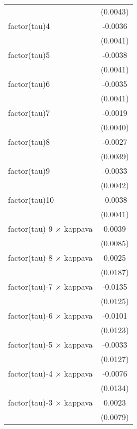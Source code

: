 \begin{tabular}{lc}
                                   & (0.0043)\\   
   factor(tau)4                    & -0.0036\\   
                                   & (0.0041)\\   
   factor(tau)5                    & -0.0038\\   
                                   & (0.0041)\\   
   factor(tau)6                    & -0.0035\\   
                                   & (0.0041)\\   
   factor(tau)7                    & -0.0019\\   
                                   & (0.0040)\\   
   factor(tau)8                    & -0.0027\\   
                                   & (0.0039)\\   
   factor(tau)9                    & -0.0033\\   
                                   & (0.0042)\\   
   factor(tau)10                   & -0.0038\\   
                                   & (0.0041)\\   
   factor(tau)-9 $\times$ kappava  & 0.0039\\   
                                   & (0.0085)\\   
   factor(tau)-8 $\times$ kappava  & 0.0025\\   
                                   & (0.0187)\\   
   factor(tau)-7 $\times$ kappava  & -0.0135\\   
                                   & (0.0125)\\   
   factor(tau)-6 $\times$ kappava  & -0.0101\\   
                                   & (0.0123)\\   
   factor(tau)-5 $\times$ kappava  & -0.0033\\   
                                   & (0.0127)\\   
   factor(tau)-4 $\times$ kappava  & -0.0076\\   
                                   & (0.0134)\\   
   factor(tau)-3 $\times$ kappava  & 0.0023\\   
                                   & (0.0079)\\   

\end{tabular}
